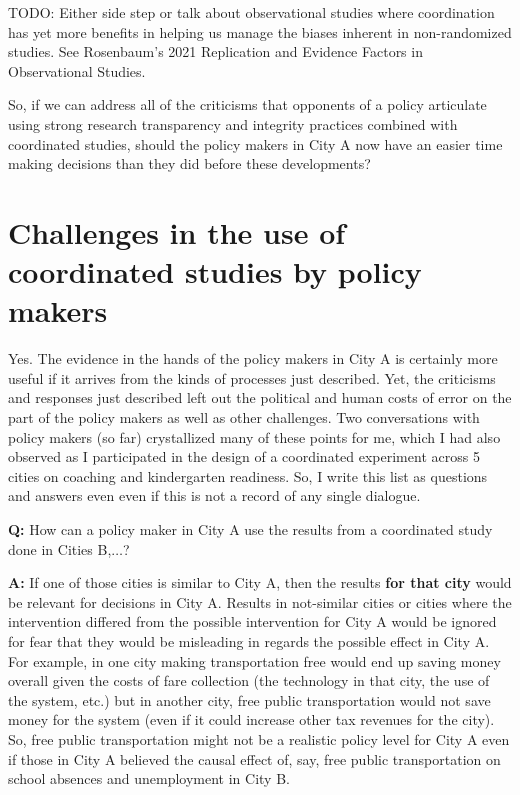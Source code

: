 \documentclass[
  11pt,
]{article}
\begin{document}
TODO: Either side step or talk about observational studies where
coordination has yet more benefits in helping us manage the biases
inherent in non-randomized studies. See Rosenbaum's 2021 Replication and
Evidence Factors in Observational Studies.

So, if we can address all of the criticisms that opponents of a policy
articulate using strong research transparency and integrity practices
combined with coordinated studies, should the policy makers in City A
now have an easier time making decisions than they did before these
developments?

\hypertarget{challenges-in-the-use-of-coordinated-studies-by-policy-makers}{%
\section{Challenges in the use of coordinated studies by policy
makers}\label{challenges-in-the-use-of-coordinated-studies-by-policy-makers}}

Yes. The evidence in the hands of the policy makers in City A is
certainly more useful if it arrives from the kinds of processes just
described. Yet, the criticisms and responses just described left out the
political and human costs of error on the part of the policy makers as
well as other challenges. Two conversations with policy makers (so far)
crystallized many of these points for me, which I had also observed as I
participated in the design of a coordinated experiment across 5 cities
on coaching and kindergarten readiness. So, I write this list as
questions and answers even even if this is not a record of any single
dialogue.

\textbf{Q:} How can a policy maker in City A use the results from a
coordinated study done in Cities B,\(\ldots\)?

\textbf{A:} If one of those cities is similar to City A, then the
results \textbf{for that city} would be relevant for decisions in City
A. Results in not-similar cities or cities where the intervention
differed from the possible intervention for City A would be ignored for
fear that they would be misleading in regards the possible effect in
City A. For example, in one city making transportation free would end up
saving money overall given the costs of fare collection (the technology
in that city, the use of the system, etc.) but in another city, free
public transportation would not save money for the system (even if it
could increase other tax revenues for the city). So, free public
transportation might not be a realistic policy level for City A even if
those in City A believed the causal effect of, say, free public
transportation on school absences and unemployment in City B.
\end{document}
